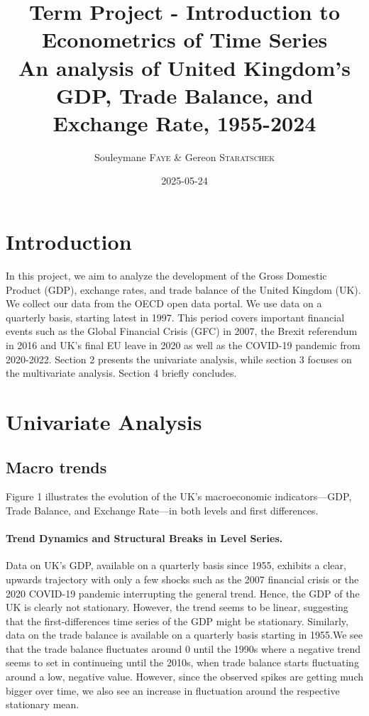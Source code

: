 \documentclass[
]{article}
\title{Term Project - Introduction to Econometrics of Time Series \\[1.5ex] 
	{\Large An analysis of United Kingdom's GDP, Trade Balance, and Exchange Rate, 1955-2024}}
\author{Souleymane \textsc{Faye} \& Gereon \textsc{Staratschek}}
\date{2025-05-24}
\begin{document}
	\maketitle
	
	\section{Introduction}
	
	In this project, we aim to analyze the development of the Gross Domestic
	Product (GDP), exchange rates, and trade balance of the United Kingdom
	(UK). We collect our data from the OECD open data portal. We use data on
	a quarterly basis, starting latest in 1997. This period covers important
	financial events such as the Global Financial Crisis (GFC) in 2007, the
	Brexit referendum in 2016 and UK's final EU leave in 2020 as well as the
	COVID-19 pandemic from 2020-2022. Section 2 presents the univariate analysis,
	while section 3 focuses on the multivariate analysis. Section 4 briefly concludes.
	
	\section{Univariate Analysis}
	
	\subsection{Macro trends}
	
	Figure 1 illustrates the evolution of the UK’s macroeconomic indicators—GDP, Trade Balance, 
	and Exchange Rate—in both levels and first differences.
	
	\paragraph*{Trend Dynamics and Structural Breaks in Level Series.} 
	Data on UK's GDP, available on a quarterly basis
	since 1955, exhibits a clear, upwards trajectory with only a few
	shocks such as the 2007 financial crisis or the 2020 COVID-19 pandemic 
	interrupting the general trend. Hence, the GDP of the UK is clearly not
	stationary. However, the trend seems to be linear, suggesting that the
	first-differences time series of the GDP might be stationary. Similarly, data on 
	the trade balance is available on a quarterly basis starting in 1955.We see that 
	the trade balance fluctuates around 0 until the 1990s where a negative trend seems to set
	in continueing until the 2010s, when trade balance starts fluctuating
	around a low, negative value. However, since the observed spikes are
	getting much bigger over time, we also see an increase in fluctuation
	around the respective stationary mean.
	
\end{document}

